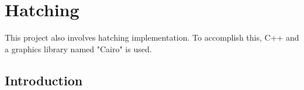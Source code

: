 \section{Hatching}
This project also involves hatching implementation. To accomplish this, C++ and a graphics library named "Cairo" is used.
\subsection{Introduction}
